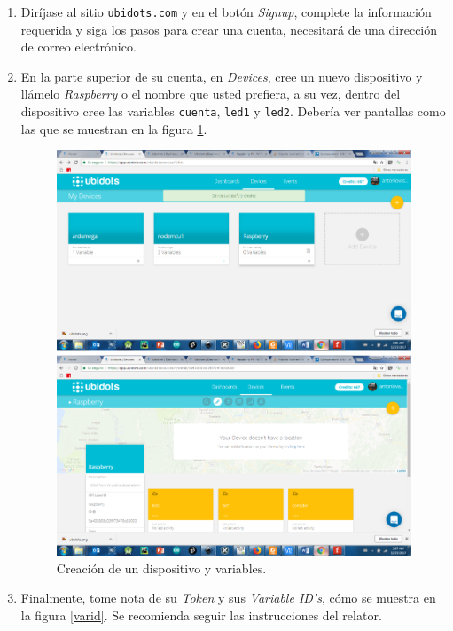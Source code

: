 \documentclass[letterpaper, 10pt]{report}
\begin{document}
\begin{enumerate}
\item Diríjase al sitio \texttt{ubidots.com} y en el botón \emph{Signup}, complete la información requerida y siga los pasos para crear una cuenta, necesitará de una dirección de correo electrónico.

\item En la parte superior de su cuenta, en \emph{Devices}, cree un nuevo dispositivo y llámelo \emph{Raspberry} o el nombre que usted prefiera, a su vez, dentro del dispositivo cree las variables \texttt{cuenta}, \texttt{led1} y \texttt{led2}. Debería ver pantallas como las que se muestran en la figura \ref{dispo}.

\begin{figure}[h!]
	\centering
	\includegraphics[scale=0.3]{dispositivo.png}
	\caption{Creación de un dispositivo y variables. \label{dispo}}
\end{figure}

\item Finalmente, tome nota de su \emph{Token} y sus \emph{Variable ID's}, cómo se muestra en la figura \ref{varid}. Se recomienda seguir las instrucciones del relator.


\end{enumerate}
\end{document}
